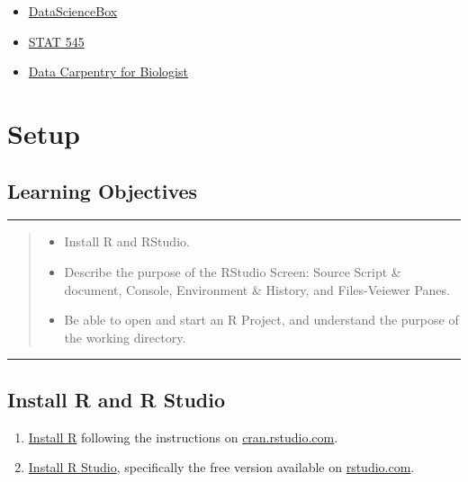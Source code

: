 \documentclass[
]{book}
\providecommand{\tightlist}{%
  \setlength{\itemsep}{0pt}\setlength{\parskip}{0pt}}
\begin{document}
\begin{itemize}
\item
  \href{https://datasciencebox.org/}{DataScienceBox}
\item
  \href{https://stat545.com/}{STAT 545}
\item
  \href{https://datacarpentry.org/semester-biology/}{Data Carpentry for Biologist}
\end{itemize}

\hypertarget{setup}{%
\chapter{Setup}\label{setup}}

\hypertarget{learning-objectives}{%
\section{Learning Objectives}\label{learning-objectives}}

\begin{center}\rule{0.5\linewidth}{0.5pt}\end{center}

\begin{quote}
\begin{itemize}
\tightlist
\item
  Install R and RStudio.\\
\item
  Describe the purpose of the RStudio Screen: Source Script \& document,
  Console, Environment \& History, and Files-Veiewer Panes.\\
\item
  Be able to open and start an R
  Project, and understand the purpose of the working directory.
\end{itemize}
\end{quote}

\begin{center}\rule{0.5\linewidth}{0.5pt}\end{center}

\hypertarget{install-r-and-r-studio}{%
\section{Install R and R Studio}\label{install-r-and-r-studio}}

\begin{enumerate}
\def\labelenumi{\arabic{enumi}.}
\tightlist
\item
  \href{https://cran.rstudio.com/}{Install R} following the instructions on \href{https://cran.rstudio.com/}{cran.rstudio.com}.\\
\item
  \href{https://rstudio.com/products/rstudio/download/\#download}{Install R Studio}, specifically the free version available on \href{https://rstudio.com/products/rstudio/download/\#download}{rstudio.com}.
\end{enumerate}
\end{document}
